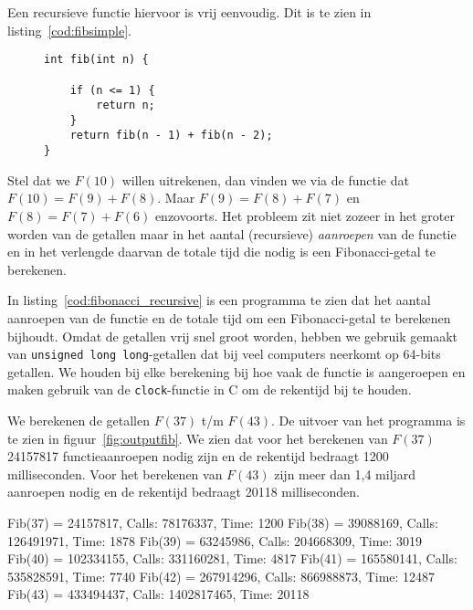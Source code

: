 Een recursieve functie hiervoor is vrij eenvoudig. Dit is te zien in listing~\ref{cod:fibsimple}.

\begin{figure}[!ht]
\begin{lstlisting}[caption=Recursieve functie voor berekenen van Fibonacci-getallen.,label=cod:fibsimple]
int fib(int n) {

    if (n <= 1) {
        return n;
    }
    return fib(n - 1) + fib(n - 2);
}
\end{lstlisting}
\end{figure}

Stel dat we $F(10)$ willen uitrekenen, dan vinden we via de functie dat $F(10)= F(9)+F(8)$. Maar $F(9) =F(8)+F(7)$ en $F(8)=F(7)+F(6)$ enzovoorts. Het probleem zit niet zozeer in het groter worden van de getallen maar in het aantal (recursieve) \textsl{aanroepen} van de functie en in het verlengde daarvan de totale tijd die nodig is een Fibonacci-getal te berekenen.

In listing~\ref{cod:fibonacci_recursive} is een programma te zien dat het aantal aanroepen van de functie en de totale tijd om een Fibonacci-getal te berekenen bijhoudt. Omdat de getallen vrij snel groot worden, hebben we gebruik gemaakt van \texttt{unsigned long long}-getallen dat bij veel computers neerkomt op 64-bits getallen.
We houden bij elke berekening bij hoe vaak de functie is aangeroepen en maken gebruik van de \texttt{clock}-functie in C om de rekentijd bij te houden.


We berekenen de getallen $F(37)$ t/m $F(43)$. De uitvoer van het programma is te zien in figuur~\ref{fig:outputfib}. We zien dat voor het berekenen van $F(37)$ 24157817 functieaanroepen nodig zijn en de rekentijd bedraagt 1200 milliseconden. Voor het berekenen van $F(43)$ zijn meer dan 1,4 miljard aanroepen nodig en de rekentijd bedraagt 20118 milliseconden.

\begin{dosbox}[title=Uitvoer van een Fibonacci-programma.,label=fig:outputfib]
Fib(37) = 24157817, Calls: 78176337, Time: 1200
Fib(38) = 39088169, Calls: 126491971, Time: 1878
Fib(39) = 63245986, Calls: 204668309, Time: 3019
Fib(40) = 102334155, Calls: 331160281, Time: 4817
Fib(41) = 165580141, Calls: 535828591, Time: 7740
Fib(42) = 267914296, Calls: 866988873, Time: 12487
Fib(43) = 433494437, Calls: 1402817465, Time: 20118
\end{dosbox}


